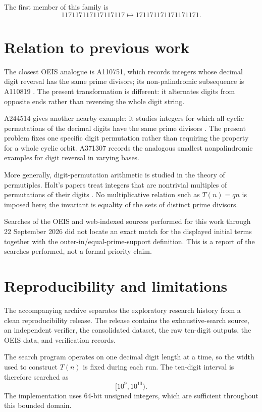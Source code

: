\documentclass[11pt]{article}
\begin{document}
The first member of this family is
\[
117117117117117117
\mapsto
171171171171171171.
\]

\section{Relation to previous work}

The closest OEIS analogue is A110751, which records integers whose decimal digit reversal has the same prime divisors; its non-palindromic subsequence is A110819 \cite{OEISA110751,OEISA110819}. The present transformation is different: it alternates digits from opposite ends rather than reversing the whole digit string.

A244514 gives another nearby example: it studies integers for which all cyclic permutations of the decimal digits have the same prime divisors \cite{OEISA244514}. The present problem fixes one specific digit permutation rather than requiring the property for a whole cyclic orbit. A371307 records the analogous smallest nonpalindromic examples for digit reversal in varying bases.

More generally, digit-permutation arithmetic is studied in the theory of permutiples. Holt's papers treat integers that are nontrivial multiples of permutations of their digits \cite{Holt2017,Holt2024}. No multiplicative relation such as \(T(n)=qn\) is imposed here; the invariant is equality of the sets of distinct prime divisors.

Searches of the OEIS and web-indexed sources performed for this work through 22 September 2026 did not locate an exact match for the displayed initial terms together with the outer-in/equal-prime-support definition. This is a report of the searches performed, not a formal priority claim.

\section{Reproducibility and limitations}

The accompanying archive separates the exploratory research history from a clean reproducibility release. The release contains the exhaustive-search source, an independent verifier, the consolidated dataset, the raw ten-digit outputs, the OEIS data, and verification records.

The search program operates on one decimal digit length at a time, so the width used to construct \(T(n)\) is fixed during each run. The ten-digit interval is therefore searched as
\[
[10^9,10^{10}).
\]
The implementation uses 64-bit unsigned integers, which are sufficient throughout this bounded domain.
\end{document}
